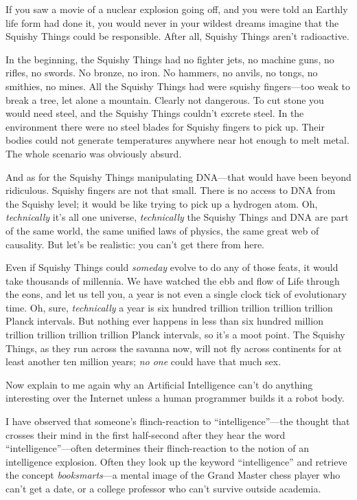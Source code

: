 {
 If you saw a movie of a nuclear explosion going off, and you were
told an Earthly life form had done it, you would never in your wildest
dreams imagine that the Squishy Things could be responsible. After all,
Squishy Things aren't radioactive.}

{
 In the beginning, the Squishy Things had no fighter jets, no
machine guns, no rifles, no swords. No bronze, no iron. No hammers, no
anvils, no tongs, no smithies, no mines. All the Squishy Things had
were squishy fingers---too weak to break a tree, let alone a mountain.
Clearly not dangerous. To cut stone you would need steel, and the
Squishy Things couldn't excrete steel. In the
environment there were no steel blades for Squishy fingers to pick up.
Their bodies could not generate temperatures anywhere near hot enough
to melt metal. The whole scenario was obviously absurd.}

{
 And as for the Squishy Things manipulating DNA---that would have
been beyond ridiculous. Squishy fingers are not that small. There is no
access to DNA from the Squishy level; it would be like trying to pick
up a hydrogen atom. Oh, \textit{technically} it's all
one universe, \textit{technically} the Squishy Things and DNA are part
of the same world, the same unified laws of physics, the same great web
of causality. But let's be realistic: you
can't get there from here.}

{
 Even if Squishy Things could \textit{someday} evolve to do any of
those feats, it would take thousands of millennia. We have watched the
ebb and flow of Life through the eons, and let us tell you, a year is
not even a single clock tick of evolutionary time. Oh, sure,
\textit{technically} a year is six hundred trillion trillion trillion
trillion Planck intervals. But nothing ever happens in less than six
hundred million trillion trillion trillion trillion Planck intervals,
so it's a moot point. The Squishy Things, as they run
across the savanna now, will not fly across continents for at least
another ten million years; \textit{no one} could have that much sex.}

{
 Now explain to me again why an Artificial Intelligence
can't do anything interesting over the Internet unless
a human programmer builds it a robot body.}

{
 I have observed that someone's flinch-reaction to
``intelligence''---the thought that
crosses their mind in the first half-second after they hear the word
``intelligence''---often determines
their flinch-reaction to the notion of an intelligence explosion. Often
they look up the keyword
``intelligence'' and retrieve the
concept \textit{booksmarts}{}---a mental image of the Grand Master
chess player who can't get a date, or a college
professor who can't survive outside academia.}

